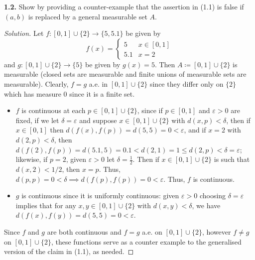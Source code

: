 \noindent \textbf{1.2.} Show by providing a counter-example that the assertion in (1.1) is false if \( (a,b) \) is replaced by a general measurable set \( A \).
\begin{proof}[Solution]
	Let \( f : [0, 1] \cup \{ 2 \} \to \{ 5, 5.1 \}  \) be given by \[f(x) = \begin{cases}
		5 & x \in [0,1] \\
	5.1 & x = 2
\end{cases}\]
and \( g : [0,1] \cup \{ 2 \} \to \{ 5 \}  \) be given by \( g(x) = 5 \). Then \( A \coloneqq [0,1] \cup \{ 2 \}  \) is measurable (closed sets are measurable and finite unions of measurable sets are measurable). Clearly, \( f = g \) a.e. in \( [0,1] \cup \{ 2 \}  \) since they differ only on \( \{ 2 \} \) which has measure 0 since it is a finite set.
\begin{itemize}
	\item \( f \) is continuous at each \( p \in [0,1] \cup \{ 2 \}  \), since if \( p \in [0,1] \) and \( \varepsilon > 0 \) are fixed, if we let \( \delta  = \varepsilon  \) and suppose \( x \in [0,1] \cup \{ 2 \}  \) with \( d(x,p) < \delta  \), then if \( x \in [0,1] \) then \( d(f(x),f(p)) = d(5,5) = 0 < \varepsilon \), and if \( x = 2 \) with \( d(2,p) < \delta  \), then \( d(f(2), f(p)) = d(5.1, 5) = 0.1 < d(2, 1) = 1 \leq d(2, p) < \delta = \varepsilon \); likewise, if \( p = 2 \), given \( \varepsilon > 0 \) let \( \delta = \frac{1}{2}  \). Then if \( x \in [0,1] \cup \{ 2 \}  \) is such that \( d(x,2) < 1/2 \), then \( x = p \). Thus, \( d(p,p) = 0 < \delta \implies d(f(p),f(p)) = 0 < \varepsilon . \) Thus, \( f \) is continuous.
	\item \(g\) is continuous since it is uniformly continuous: given \( \varepsilon > 0 \) choosing \( \delta = \varepsilon  \) implies that for any \( x, y \in [0,1] \cup \{ 2 \}  \) with \( d(x,y) < \delta  \), we have \( d(f(x),f(y)) = d(5, 5) = 0 < \varepsilon   \).
\end{itemize}
Since \( f \) and \( g \) are both continuous and \( f = g \) a.e. on \( [0,1] \cup \{ 2 \}  \), however \( f \neq g \) on \( [0,1] \cup \{ 2 \}  \), these functions serve as a counter example to the generalised version of the claim in (1.1), as needed.
\end{proof}
